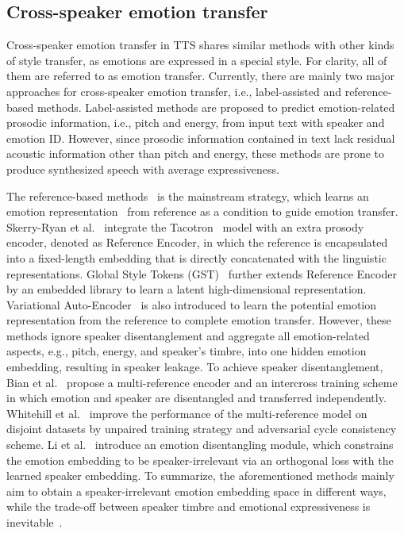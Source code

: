 \documentclass[journal,comsoc]{IEEEtran}
\begin{document}
\vspace{-0.1cm}
\subsection{Cross-speaker emotion transfer}

Cross-speaker emotion transfer in TTS shares similar methods with other kinds of style transfer, as emotions are expressed in a special style. 
For clarity, all of them are referred to as emotion transfer.
Currently, there are mainly two major approaches for cross-speaker emotion transfer, i.e., label-assisted and reference-based methods. 
Label-assisted\cite{pan21d_interspeech,xie2021multi} methods are proposed to predict emotion-related prosodic information, i.e., pitch and energy, from input text with speaker and emotion ID. 
However, since prosodic information contained in text lack residual acoustic information other than pitch and energy, these methods are prone to produce synthesized speech with average expressiveness.

The reference-based methods~\cite{Skerry2018Towards,Wang2018Style,Zhang2019LearningLR,zhang2022iemotts,Li2021ControllableET,liu2021expressive} is the mainstream strategy, which learns an emotion representation~\cite{liu22i_interspeech} from reference as a condition to guide emotion transfer.
Skerry-Ryan et al.~\cite{Skerry2018Towards} integrate the Tacotron~\cite{wang2017tacotron,shen2018natural} model with an extra prosody encoder, denoted as Reference Encoder, in which the reference is encapsulated into a fixed-length embedding that is directly concatenated with the linguistic representations.
Global Style Tokens (GST)~\cite{Wang2018Style} further extends Reference Encoder by an embedded library to learn a latent high-dimensional representation.
Variational Auto-Encoder~\cite{Zhang2019LearningLR} is also introduced to learn the potential emotion representation from the reference to complete emotion transfer. 
However, these methods ignore speaker disentanglement and aggregate all emotion-related aspects, e.g., pitch, energy, and speaker's timbre, into one hidden emotion embedding, resulting in speaker leakage.
To achieve speaker disentanglement, Bian et al.~\cite{Bian2019Multi} propose a multi-reference encoder and an intercross training scheme in which emotion and speaker are disentangled and transferred independently.
Whitehill et al.~\cite{2019Multi} improve the performance of the multi-reference model on disjoint datasets by unpaired training strategy and adversarial cycle consistency scheme.
Li et al.~\cite{Li2021ControllableCE} introduce an emotion disentangling module, which constrains the emotion embedding to be speaker-irrelevant via an orthogonal loss with the learned speaker embedding.
To summarize, the aforementioned methods mainly aim to obtain a speaker-irrelevant emotion embedding space in different ways, while the trade-off between speaker timbre and emotional expressiveness is inevitable~\cite{Karlapati2020CopyCatMF,li22h_interspeech}.
\end{document}

